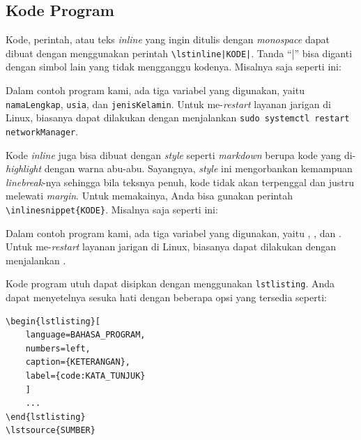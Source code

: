 \subsection{Kode Program}

Kode, perintah, atau teks \textit{inline} yang ingin ditulis dengan \textit{monospace} dapat dibuat dengan menggunakan perintah \verb"\lstinline|KODE|". Tanda ``|'' bisa diganti dengan simbol lain yang tidak mengganggu kodenya. Misalnya saja seperti ini:

Dalam contoh program kami, ada tiga variabel yang digunakan, yaitu \lstinline|namaLengkap|, \lstinline|usia|, dan \lstinline|jenisKelamin|. Untuk me-\textit{restart} layanan jarigan di Linux, biasanya dapat dilakukan dengan menjalankan \lstinline|sudo systemctl restart networkManager|.

Kode \textit{inline} juga bisa dibuat dengan \textit{style} seperti \textit{markdown} berupa kode yang di-\textit{highlight} dengan warna abu-abu. Sayangnya, \textit{style} ini mengorbankan kemampuan \textit{linebreak}-nya sehingga bila teksnya penuh, kode tidak akan terpenggal dan justru melewati \textit{margin}. Untuk memakainya, Anda bisa gunakan perintah \verb|\inlinesnippet{KODE}|. Misalnya saja seperti ini:

Dalam contoh program kami, ada tiga variabel yang digunakan, yaitu , , dan . Untuk me-\textit{restart} layanan jarigan di Linux, biasanya dapat dilakukan dengan menjalankan .

Kode program utuh dapat disipkan dengan menggunakan \texttt{lstlisting}. Anda dapat menyetelnya sesuka hati dengan beberapa opsi yang tersedia seperti:

\begin{verbatim}
\begin{lstlisting}[
    language=BAHASA_PROGRAM, 
    numbers=left, 
    caption={KETERANGAN}, 
    label={code:KATA_TUNJUK}
    ]
    ...
\end{lstlisting}
\lstsource{SUMBER}
\end{verbatim}

